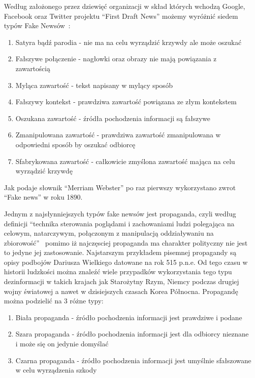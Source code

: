 Według założonego przez dziewięć organizacji w skład których wchodzą 
Google, Facebook oraz Twitter projektu ``First Draft News''
możemy wyróżnić siedem typów Fake Newsów~\cite{TypesOfFakeNews}:
\begin{enumerate}
    \item Satyra bądź parodia - nie ma na celu wyrządzić krzywdy ale może oszukać
    \item Fałszywe połączenie - nagłowki oraz obrazy nie mają powiązania z zawartością
    \item Myląca zawartość - tekst napisany w mylący sposób
    \item Fałszywy kontekst - prawdziwa zawartość powiązana ze złym kontekstem
    \item Oszukana zawartość - źródła pochodzenia informacji są fałszywe
    \item Zmanipulowana zawartość - prawdziwa zawartość zmanipulowana w odpowiedni sposób by oszukać odbiorcę
    \item Sfabrykowana zawartość - całkowicie zmyślona zawartość mająca na celu wyrządzić krzywdę
\end{enumerate}
Jak podaje słownik ``Merriam Webster'' po raz pierwszy wykorzystano zwrot
``Fake news'' w roku 1890.


Jednym z najsłynniejszych typów fake newsów jest propaganda, czyli według 
definicji ``technika sterowania poglądami i zachowaniami ludzi polegająca na 
celowym, natarczywym, połączonym z manipulacją oddziaływaniu na zbiorowość''~\cite{SJP}
pomimo iż najczęsciej propaganda ma charakter polityczny nie jest to jedyne 
jej zastosowanie. Najstarszym przykładem pisemnej propagandy są opisy podbojów
Dariusza Wielkiego datowane na rok 515 p.n.e. Od tego czasu w historii ludzkości
można znaleźć wiele przypadków wykorzystania tego typu dezinformacji w takich krajach
jak Starożytny Rzym, Niemcy podczas drugiej wojny światowej a nawet w dzisiejszych 
czasach Korea Północna.
Propagandę można podzielić na 3 różne typy:
\begin{enumerate}
    \item Biała propaganda - źródło pochodzenia informacji jest prawdziwe i podane
    \item Szara propaganda - źródło pochodzenia informacji jest dla odbiorcy nieznane i może się on jedynie domyślać
    \item Czarna propaganda - źródło pochodzenia informacji jest umyślnie sfałszowane w celu wyrządzenia szkody 
\end{enumerate}


